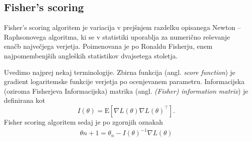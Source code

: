 \documentclass[12pt,a4paper]{amsart}
\theoremstyle{definition} %
\theoremstyle{plain} %
\begin{document}



\subsection{Fisher's scoring}
Fisher's scoring algoritem je variacija v prejšnjem razdelku opisanega Newton -- Raphsonovega algoritma, ki se v statistiki uporablja za numerično reševanje enačb največjega 
verjetja. Poimenovana je po Ronaldu Fisherju, enem najpomembenjših angleških statistikov dvajsetega stoletja.

Uvedimo najprej nekaj terminologije. Zbirna funkcija (angl. \textit{score function}) je gradient logaritemske funkcije verjetja po ocenjevanem parametru.
Informacijska (oziroma Fisherjeva Informacijska) matrika (angl. \textit{(Fisher) information matrix}) je definirana kot 
\[
    I(\theta) = \mathrm{E}[\nabla L(\theta) \nabla L(\theta)^\top ]. %
\]
Fisher scoring algoritem sedaj je po zgornjih oznakah 
\begin{align}
    \theta{n + 1} = \theta_{n} - I(\theta)^{-1}\nabla L(\theta)
\end{align}
\end{document}
